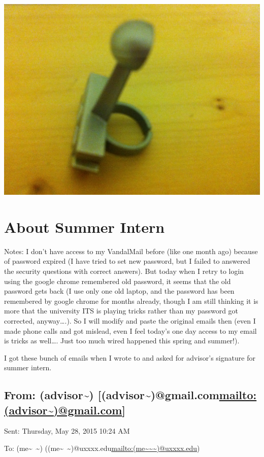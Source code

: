 \documentclass[9pt,b5paper]{article}
\begin{document}
\includegraphics[width=.9\linewidth]{./ring/IMG_0373.JPG}


\section{About Summer Intern}
\label{sec-7}
Notes: I don't have access to my VandalMail before (like one month ago) because of password expired (I have tried to set new password, but I failed to answered the security questions with correct answers). But today when I retry to login using the google chrome remembered old password, it seems that the old password gets back (I use only one old laptop, and the password has been remembered by google chrome for months already, though I am still thinking it is more that the university ITS is playing tricks rather than my password got corrected, anyway\ldots{}.). So I will modify and paste the original emails then (even I made phone calls and got mislead, even I feel today's one day access to my email is tricks as well\ldots{}. Just too much wired happened this spring and summer!). 

I got these bunch of emails when I wrote to and asked for advisor's signature for summer intern. 

\subsection{From: (advisor\textasciitilde{}) [(advisor\textasciitilde{})@gmail.com\url{mailto:(advisor~)@gmail.com}]}
\label{sec-7-1}
Sent: Thursday, May 28, 2015 10:24 AM

To: (me\textasciitilde{}~\textasciitilde{}) ((me\textasciitilde{}~\textasciitilde{})@uxxxx.edu\url{mailto:(me~~~)@uxxxx.edu})
\end{document}
